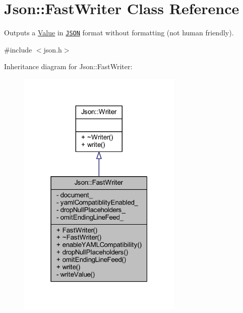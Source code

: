 \hypertarget{class_json_1_1_fast_writer}{}\section{Json\+:\+:Fast\+Writer Class Reference}
\label{class_json_1_1_fast_writer}


Outputs a \hyperlink{class_json_1_1_value}{Value} in \href{http://www.json.org}{\tt J\+S\+ON} format without formatting (not human friendly).  




{\ttfamily \#include $<$json.\+h$>$}



Inheritance diagram for Json\+:\+:Fast\+Writer\+:\nopagebreak
\begin{figure}[H]
\begin{center}
\leavevmode
\includegraphics[width=223pt]{class_json_1_1_fast_writer__inherit__graph}
\end{center}
\end{figure}


